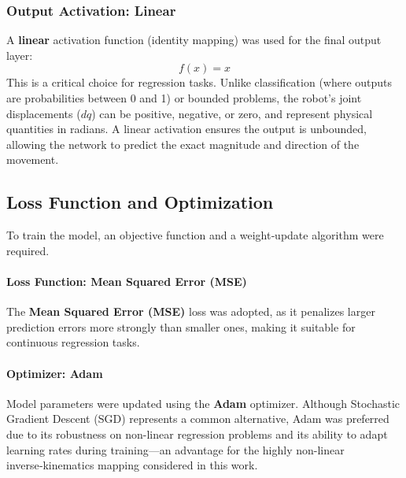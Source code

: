 \documentclass[a4paper,11pt]{article}
\begin{document}
\subsubsection{Output Activation: Linear}
A \textbf{linear} activation function (identity mapping) was used for the final output layer:
\begin{equation}
    f(x) = x
\end{equation}
This is a critical choice for regression tasks. Unlike classification (where outputs are probabilities between 0 and 1) or bounded problems, the robot's joint displacements ($dq$) can be positive, negative, or zero, and represent physical quantities in radians. A linear activation ensures the output is unbounded, allowing the network to predict the exact magnitude and direction of the movement.

\subsection{Loss Function and Optimization}
To train the model, an objective function and a weight‑update algorithm were required.

\paragraph{Loss Function: Mean Squared Error (MSE)}
The \textbf{Mean Squared Error (MSE)} loss was adopted, as it penalizes larger prediction errors more strongly than smaller ones, making it suitable for continuous regression tasks.

\paragraph{Optimizer: Adam}
Model parameters were updated using the \textbf{Adam} optimizer. Although Stochastic Gradient Descent (SGD) represents a common alternative, Adam was preferred due to its robustness on non-linear regression problems and its ability to adapt learning rates during training—an advantage for the highly non-linear inverse‑kinematics mapping considered in this work.
\end{document}
